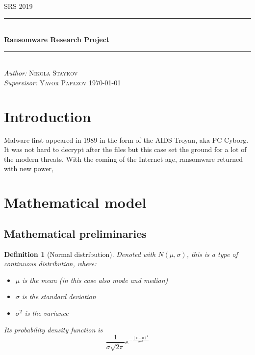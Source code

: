 \documentclass[11pt, a4paper]{article}
\newtheorem{definition}{Definition}
\begin{document}
\begin{titlepage}
	\newcommand{\HRule}{\rule{\linewidth}{0.5mm}}
	\centering
	\textsc{\LARGE SRS 2019}\\[1cm]
	\HRule\\[1 cm]
	
	{\huge\bfseries Ransomware Research Project }\\[0.5 cm] 
	\HRule\\
    \vfill
			\Large
			\textit{Author:}
			 \textsc{Nikola Staykov}\\
             \vspace{2cm}
			\Large
			\textit{Supervisor:}
            \textsc{Yavor Papazov}
    \vfill	
	{\large\today}   
	\vfill
\end{titlepage}

\tableofcontents
\newpage
\begin{abstract}
		Malware is a type of computer virus, which encrypts the files on a given system and asks for a ransom in order for them to be decrypted. Ransomware authors have no way of knowing their victim's data value, or more precisely what people \textit{think} their data costs. They can, however, make small surveys before launching the main campaign, in order to estimate the aforementioned distribution. This paper explores a model in order to find the most suitable parameters for such a survey. This approach is key to finding the best price for the ransom.
\end{abstract}

\section{Introduction}
		Malware first appeared in 1989 in the form of the AIDS Troyan, aka PC Cyborg. It was not hard to decrypt after the files but this case set the ground for a lot of the modern threats. With the coming of the Internet age, ransomware returned with new power, 
\newpage
\section{Mathematical model}
	\subsection{Mathematical preliminaries}
		\begin{definition}[Normal distribution]
			Denoted with $N(\mu, \sigma)$, this is a type of continuous distribution, where:
			\begin{itemize}
				\item $\mu$ is the mean (in this case also mode and median)
				\item $\sigma$ is the standard deviation
				\item $\sigma^{2}$ is the variance
				
			\end{itemize}
			Its probability density function is
				$$\frac{1}{\sigma\sqrt{2\pi}}e^{-\frac{(x-\mu)^{2}}{2\sigma^{2}}}$$
		\end{definition}
	
\end{document}
